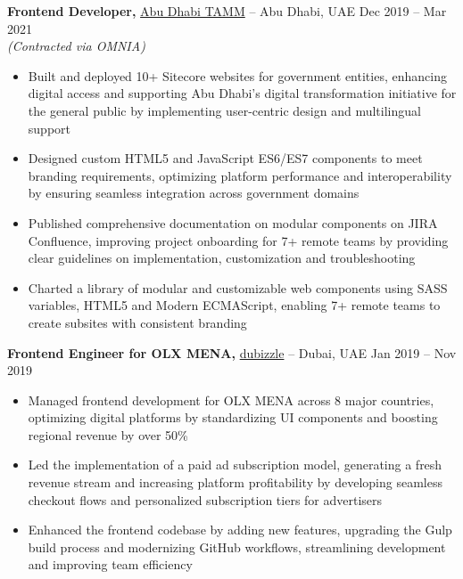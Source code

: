 \documentclass[10pt,letterpaper]{article}
\begin{document}
\textbf{Frontend Developer,} \href{https://www.tamm.abudhabi/}{Abu Dhabi TAMM} -- Abu Dhabi, UAE \hfill Dec 2019 -- Mar 2021 \\
\textit{(Contracted via OMNIA)}  
\vspace{-5pt}
\begin{itemize}
  \item Built and deployed 10+ Sitecore websites for government entities, enhancing digital access and supporting Abu Dhabi's digital transformation initiative for the general public by implementing user-centric design and multilingual support
  \item Designed custom HTML5 and JavaScript ES6/ES7 components to meet branding requirements, optimizing platform performance and interoperability by ensuring seamless integration across government domains
  \item Published comprehensive documentation on modular components on JIRA Confluence, improving project onboarding for 7+ remote teams by providing clear guidelines on implementation, customization and troubleshooting
  \item Charted a library of modular and customizable web components using SASS variables, HTML5 and Modern ECMAScript, enabling 7+ remote teams to create subsites with consistent branding
\end{itemize}


\textbf{Frontend Engineer for OLX MENA,} \href{https://www.dubizzle.com/}{dubizzle} -- Dubai, UAE \hfill Jan 2019 -- Nov 2019 \\
\vspace{-5pt}
\begin{itemize}
  \item Managed frontend development for OLX MENA across 8 major countries, optimizing digital platforms by standardizing UI components and boosting regional revenue by over 50\%
  \item Led the implementation of a paid ad subscription model, generating a fresh revenue stream and increasing platform profitability by developing seamless checkout flows and personalized subscription tiers for advertisers
  \item Enhanced the frontend codebase by adding new features, upgrading the Gulp build process and modernizing GitHub workflows, streamlining development and improving team efficiency
\end{itemize}
\end{document}
